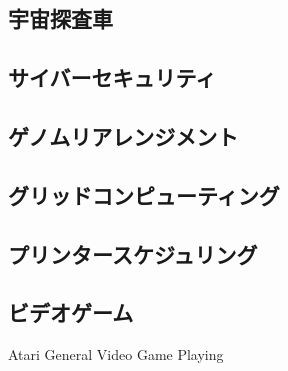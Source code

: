 \documentclass{report}
\begin{document}
\subsection{宇宙探査車}

\subsection{サイバーセキュリティ}

\subsection{ゲノムリアレンジメント}

\subsection{グリッドコンピューティング}

\subsection{プリンタースケジュリング}

\subsection{ビデオゲーム}
Atari
General Video Game Playing




\end{document}
